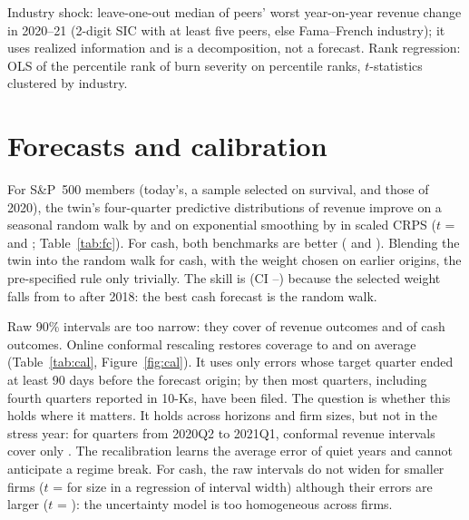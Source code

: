 \documentclass[11pt]{article}
\begin{document}
\begin{table}[t]
\centering\scriptsize
\caption{Fragility and exposure in 2020}
\label{tab:exposure}

\par\smallskip
\begin{minipage}{\linewidth}\footnotesize
Industry shock: leave-one-out median of peers' worst year-on-year revenue change in 2020--21 (2-digit SIC with at least five peers, else Fama--French industry); it uses realized information and is a decomposition, not a forecast. Rank regression: OLS of the percentile rank of burn severity on percentile ranks, $t$-statistics clustered by industry.
\end{minipage}
\end{table}

\section{Forecasts and calibration}\label{sec:forecasts}
For S\&P~500 members (today's, a sample selected on survival, and those of 2020), the twin's four-quarter predictive distributions of revenue improve on a seasonal random walk by \FcRevRw{} and on exponential smoothing by \FcRevEts{} in scaled CRPS ($t$ = \FcRevRwT{} and \FcRevEtsT; Table~\ref{tab:fc}). For cash, both benchmarks are better (\FcCashRw{} and \FcCashEts). Blending the twin into the random walk for cash, with the weight chosen on earlier origins, \CashHybVerdict{} the pre-specified rule only trivially. The skill is \CashHybSkill{} (CI \CashHybLo--\CashHybHi) because the selected weight falls from \CashLamHi{} to \CashLamLo{} after 2018: the best cash forecast is the random walk.

Raw 90\% intervals are too narrow: they cover \CalRevRaw{} of revenue outcomes and \CalCashRaw{} of cash outcomes. Online conformal rescaling restores coverage to \CalRevConf{} and \CalCashConf{} on average (Table~\ref{tab:cal}, Figure~\ref{fig:cal}). It uses only errors whose target quarter ended at least 90 days before the forecast origin; by then most quarters, including fourth quarters reported in 10-Ks, have been filed. The question is whether this holds where it matters. It holds across horizons and firm sizes, but not in the stress year: for quarters from 2020Q2 to 2021Q1, conformal revenue intervals cover only \CalRevStress. The recalibration learns the average error of quiet years and cannot anticipate a regime break. For cash, the raw intervals do not widen for smaller firms ($t$ = \CalCashWidthSizeT{} for size in a regression of interval width) although their errors are larger ($t$ = \CalCashErrSizeT): the uncertainty model is too homogeneous across firms.
\end{document}
